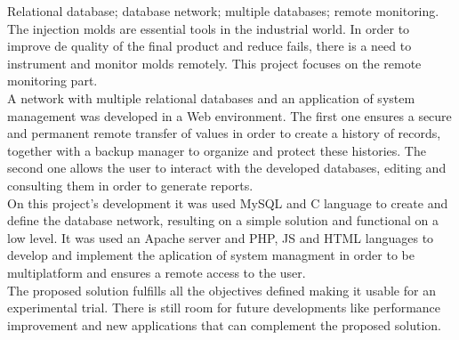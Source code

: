 \documentclass[11pt,twoside,a4paper]{report}
\begin{document}
\TitlePage
  \vspace*{55mm}
  {Relational database; database network; multiple databases; remote monitoring.}
  {The injection molds are essential tools in the industrial world. In order to improve de quality of the final product and reduce fails, there is a need to instrument and monitor molds remotely. This project focuses on the remote monitoring part.\\
  A network with multiple relational databases and an application of system management was developed in a Web environment. The first one ensures a secure and permanent remote transfer of values in order to create a history of records, together with a backup manager to organize and protect these histories. The second one allows the user to interact with the developed databases, editing and consulting them in order to generate reports.\\
  On this project's development it was used MySQL and C language to create and define the database network, resulting on a simple solution and functional on a low level. It was used an Apache server and PHP, JS and HTML languages to develop and implement the aplication of system managment in order to be multiplatform and ensures a remote access to the user.\\
  The proposed solution fulfills all the objectives defined making it usable for an experimental trial. There is still room for future developments like performance improvement and new applications that can complement the proposed solution.}
\EndTitlePage
\titlepage\ \endtitlepage %


%
%

\tableofcontents

\cleardoublepage
\listoffigures

\cleardoublepage
\listoftables



\cleardoublepage
{}
\end{document}
